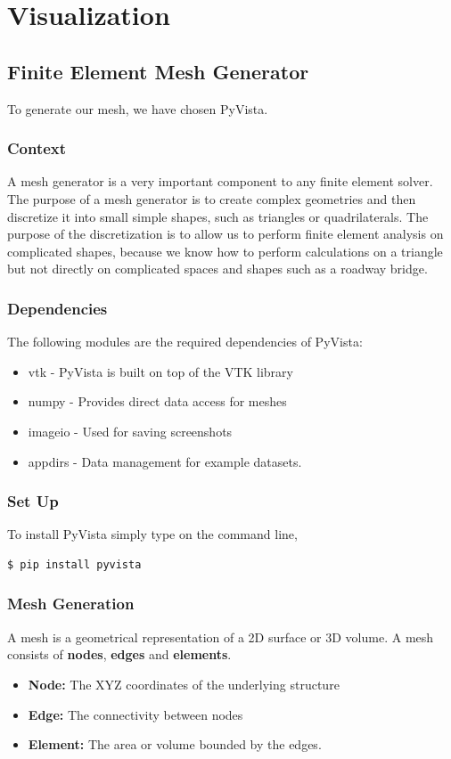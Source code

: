 \documentclass[onecolumn, draftclsnofoot,10pt, compsoc]{IEEEtran}
\begin{document}
\section{Visualization}
\subsection{Finite Element Mesh Generator}
To generate our mesh, we have chosen PyVista.
\subsubsection{Context}
A mesh generator is a very important component to any finite element solver. The purpose of a mesh generator is to create complex geometries and then discretize it into small simple shapes, such as triangles or quadrilaterals. The purpose of the discretization is to allow us to perform finite element analysis on complicated shapes, because we know how to perform calculations on a triangle but not directly on complicated spaces and shapes such as a roadway bridge.
\subsubsection{Dependencies}
The following modules are the required dependencies of PyVista:
\begin{itemize}
    \item vtk - PyVista is built on top of the VTK library
    \item numpy - Provides direct data access for meshes
    \item imageio - Used for saving screenshots
    \item appdirs - Data management for example datasets.
\end{itemize}
\subsubsection{Set Up}
To install PyVista simply type on the command line,
\begin{lstlisting}[language=bash]
  $ pip install pyvista
\end{lstlisting}
\subsubsection{Mesh Generation}
A mesh is a geometrical representation of a 2D surface or 3D volume. A mesh consists of \textbf{nodes}, \textbf{edges} and \textbf{elements}.
\begin{itemize}
    \item \textbf{Node:} The XYZ coordinates of the underlying structure
    \item \textbf{Edge:} The connectivity between nodes
    \item \textbf{Element:} The area or volume bounded by the edges.
\end{itemize}
\end{document}
